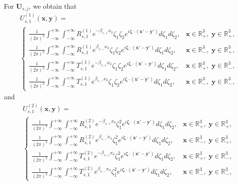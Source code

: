 \documentclass[final,reqno]{siamltex}
\newcommand{\mat}{\mathbb}
\newcommand{\R}{{\mat R}}
\begin{document}
For $\mathbf{U}_{s,j}$, we obtain that  
\begin{align*}
&U_{s,1}^{(1)}(\mathbf{x},\mathbf{y})=\\
&\left\{
\begin{array}{ll}
	\displaystyle\frac{1}{(2\pi)^2}\int_{-\infty}^{+\infty}\int_{-\infty}^{+\infty}R_{s,1}^{(1)}e^{-\beta_{s,+}x_3}\zeta_1\zeta_2e^{i\boldsymbol{\zeta}\cdot(\mathbf{x}'-\mathbf{y}')}d\zeta_1d\zeta_2,&\mathbf{x}\in\R^3_+,\;\mathbf{y}\in\R^3_+,\\
	\displaystyle\frac{1}{(2\pi)^2}\int_{-\infty}^{+\infty}\int_{-\infty}^{+\infty}R_{s,1}^{(1)}e^{\beta_{s,-}x_3}\zeta_1\zeta_2e^{i\boldsymbol{\zeta}\cdot(\mathbf{x}'-\mathbf{y}')}d\zeta_1d\zeta_2,&\mathbf{x}\in\R^3_-,\;\mathbf{y}\in\R^3_+, \\
	\displaystyle\frac{1}{(2\pi)^2}\int_{-\infty}^{+\infty}\int_{-\infty}^{+\infty}T_{s,1}^{(1)}e^{-\beta_{s,+}x_3}\zeta_1\zeta_2e^{i\boldsymbol{\zeta}\cdot(\mathbf{x}'-\mathbf{y}')}d\zeta_1d\zeta_2,&\mathbf{x}\in\R^3_+,\;\mathbf{y}\in\R^3_-, \\
	\displaystyle\frac{1}{(2\pi)^2}\int_{-\infty}^{+\infty}\int_{-\infty}^{+\infty}T_{s,1}^{(1)}e^{\beta_{s,-}x_3}\zeta_1\zeta_2e^{i\boldsymbol{\zeta}\cdot(\mathbf{x}'-\mathbf{y}')}d\zeta_1d\zeta_2,&\mathbf{x}\in\R^3_-,\;\mathbf{y}\in\R^3_-, 
\end{array}
\right.
\end{align*}
and 
\begin{align*}
&U_{s,1}^{(2)}(\mathbf{x},\mathbf{y})=\\
&\left\{
\begin{array}{ll}
	\displaystyle\frac{1}{(2\pi)^2}\int_{-\infty}^{+\infty}\int_{-\infty}^{+\infty}R_{s,1}^{(2)}e^{-\beta_{s,+}x_3}\zeta_1^2e^{i\boldsymbol{\zeta}\cdot(\mathbf{x}'-\mathbf{y}')}d\zeta_1d\zeta_2,&\mathbf{x}\in\R^3_+,\;\mathbf{y}\in\R^3_+,\\
	\displaystyle\frac{1}{(2\pi)^2}\int_{-\infty}^{+\infty}\int_{-\infty}^{+\infty}R_{s,1}^{(2)}e^{\beta_{s,-}x_3}\zeta_1^2e^{i\boldsymbol{\zeta}\cdot(\mathbf{x}'-\mathbf{y}')}d\zeta_1d\zeta_2,&\mathbf{x}\in\R^3_-,\;\mathbf{y}\in\R^3_+, \\
	\displaystyle\frac{1}{(2\pi)^2}\int_{-\infty}^{+\infty}\int_{-\infty}^{+\infty}T_{s,1}^{(2)}e^{-\beta_{s,+}x_3}\zeta_1^2e^{i\boldsymbol{\zeta}\cdot(\mathbf{x}'-\mathbf{y}')}d\zeta_1d\zeta_2,&\mathbf{x}\in\R^3_+,\;\mathbf{y}\in\R^3_-, \\
	\displaystyle\frac{1}{(2\pi)^2}\int_{-\infty}^{+\infty}\int_{-\infty}^{+\infty}T_{s,1}^{(2)}e^{\beta_{s,-}x_3}\zeta_1^2e^{i\boldsymbol{\zeta}\cdot(\mathbf{x}'-\mathbf{y}')}d\zeta_1d\zeta_2,&\mathbf{x}\in\R^3_-,\;\mathbf{y}\in\R^3_-, 
\end{array}
\right.
\end{align*}
\end{document}
